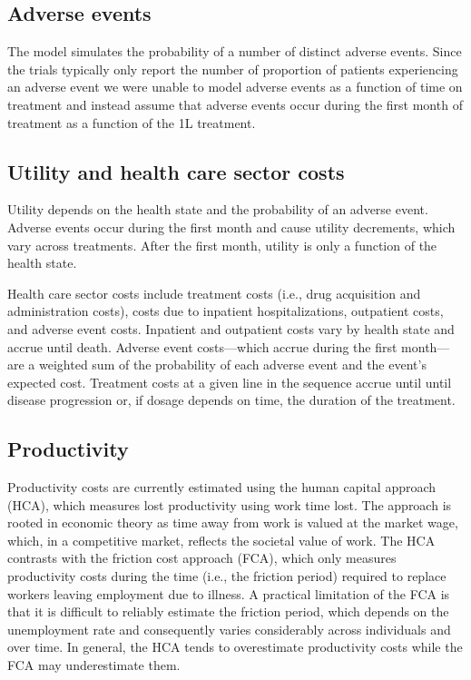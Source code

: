 \documentclass[11pt,final,fleqn]{article}\usepackage[]{graphicx}\usepackage[]{color}
\theoremstyle{plain}
\begin{document}
{\FloatBarrier

\subsection{Adverse events}
The model simulates the probability of a number of distinct adverse events. Since the trials typically only report the number of proportion of patients experiencing an adverse event we were unable to model adverse events as a function of time on treatment and instead assume that adverse events occur during the first month of treatment as a function of the 1L treatment.

\subsection{Utility and health care sector costs}
Utility depends on the health state and the probability of an adverse event. Adverse events occur during the first month and cause utility decrements, which vary across treatments. After the first month, utility is only a function of the health state. 

Health care sector costs include treatment costs (i.e., drug acquisition and administration costs), costs due to inpatient hospitalizations, outpatient costs, and adverse event costs. Inpatient and outpatient costs vary by health state and accrue until death. Adverse event costs---which accrue during the first month---are a weighted sum of the probability of each adverse event and the event's expected cost. Treatment costs at a given line in the sequence accrue until until disease progression or, if dosage depends on time, the duration of the treatment.

\subsection{Productivity}
Productivity costs are currently estimated using the human capital approach (HCA), which measures lost productivity using work time lost. The approach is rooted in economic theory as time away from work is valued at the market wage, which, in a competitive market, reflects the societal value of work. The HCA contrasts with the friction cost approach (FCA), which only measures productivity costs during the time (i.e., the friction period) required to replace workers leaving employment due to illness. A practical limitation of the FCA is that it is difficult to reliably estimate the friction period, which depends on the unemployment rate and consequently varies considerably across individuals and over time. In general, the HCA tends to overestimate productivity costs while the FCA may underestimate them. 

}
\end{document}
